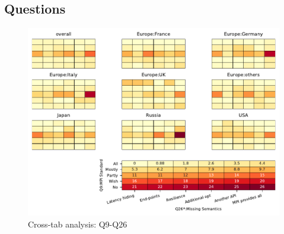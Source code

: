 
\subsection{Questions}


\begin{figure}
\begin{center}
\includegraphics[width=12cm]{../pdfs/Q9-Q26.pdf}
\caption{Cross-tab analysis: Q9-Q26}
\label{fig:Q9-Q26}
\end{center}
\end{figure}
